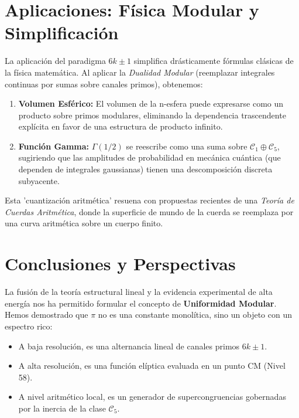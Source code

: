 \documentclass{article}
\theoremstyle{plain}
\theoremstyle{definition}
\theoremstyle{remark}
\numberwithin{equation}{section}
\begin{document}
\section{Aplicaciones: Física Modular y Simplificación}

La aplicación del paradigma $6k \pm 1$ simplifica drásticamente fórmulas clásicas de la física matemática. Al aplicar la \textit{Dualidad Modular} (reemplazar integrales continuas por sumas sobre canales primos), obtenemos:

\begin{enumerate}
    \item \textbf{Volumen Esférico:} El volumen de la n-esfera puede expresarse como un producto sobre primos modulares, eliminando la dependencia trascendente explícita en favor de una estructura de producto infinito.
    \item \textbf{Función Gamma:} $\Gamma(1/2)$ se reescribe como una suma sobre $\mathcal{C}_1 \oplus \mathcal{C}_5$, sugiriendo que las amplitudes de probabilidad en mecánica cuántica (que dependen de integrales gaussianas) tienen una descomposición discreta subyacente.
\end{enumerate}

Esta 'cuantización aritmética' resuena con propuestas recientes de una \textit{Teoría de Cuerdas Aritmética}, donde la superficie de mundo de la cuerda se reemplaza por una curva aritmética sobre un cuerpo finito.

\section{Conclusiones y Perspectivas}

La fusión de la teoría estructural lineal y la evidencia experimental de alta energía nos ha permitido formular el concepto de \textbf{Uniformidad Modular}. Hemos demostrado que $\pi$ no es una constante monolítica, sino un objeto con un espectro rico:
\begin{itemize}
    \item A baja resolución, es una alternancia lineal de canales primos $6k \pm 1$.
    \item A alta resolución, es una función elíptica evaluada en un punto CM (Nivel 58).
    \item A nivel aritmético local, es un generador de supercongruencias gobernadas por la inercia de la clase $\mathcal{C}_5$.
\end{itemize}
\end{document}
